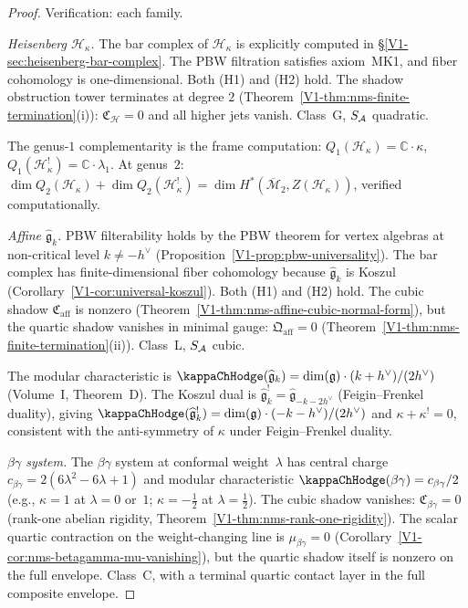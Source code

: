 \begin{proof}
Verification: each family.

\emph{Heisenberg $\mathcal{H}_\kappa$.}
The bar complex of $\mathcal{H}_\kappa$ is explicitly
computed in \S\ref{V1-sec:heisenberg-bar-complex}. The
PBW filtration satisfies axiom~MK1, and fiber
cohomology is one-dimensional. Both (H1) and (H2) hold.
The shadow obstruction tower terminates at degree $2$
(Theorem~\ref{V1-thm:nms-finite-termination}(i)):
$\mathfrak{C}_{\mathcal{H}} = 0$ and all higher jets vanish.
Class~G, $S_{\mathcal{A}}$ quadratic.

The genus-$1$ complementarity is the frame computation:
$Q_1(\mathcal{H}_\kappa) = \mathbb{C} \cdot \kappa$,
$Q_1(\mathcal{H}_\kappa^!) = \mathbb{C} \cdot \lambda_1$.
At genus~$2$:
$\dim Q_2(\mathcal{H}_\kappa) + \dim Q_2(\mathcal{H}_\kappa^!)
= \dim H^*(\overline{\mathcal{M}}_2, Z(\mathcal{H}_\kappa))$,
verified computationally.

\emph{Affine $\widehat{\mathfrak{g}}_k$.}
PBW filterability holds by the PBW theorem for vertex algebras
at non-critical level $k \ne -h^{\vee}$
(Proposition~\ref{V1-prop:pbw-universality}).
The bar complex has finite-dimensional fiber cohomology
because $\widehat{\mathfrak{g}}_k$ is Koszul
(Corollary~\ref{V1-cor:universal-koszul}).
Both (H1) and (H2) hold.
The cubic shadow $\mathfrak{C}_{\mathrm{aff}}$ is nonzero
(Theorem~\ref{V1-thm:nms-affine-cubic-normal-form}), but the
quartic shadow vanishes in minimal gauge:
$\mathfrak{Q}_{\mathrm{aff}} = 0$
(Theorem~\ref{V1-thm:nms-finite-termination}(ii)).
Class~L, $S_{\mathcal{A}}$ cubic.

The modular characteristic is
$\kappaChHodge(\widehat{\mathfrak{g}}_k) = \dim(\mathfrak{g})\cdot(k+h^\vee)/(2h^\vee)$
(Volume~I, Theorem~D).
The Koszul dual is
$\widehat{\mathfrak{g}}_k^! =
\widehat{\mathfrak{g}}_{-k-2h^{\vee}}$
(Feigin--Frenkel duality), giving
$\kappaChHodge(\widehat{\mathfrak{g}}_k^!)
= \dim(\mathfrak{g}) \cdot (-k - h^{\vee})/(2h^{\vee})$
and $\kappa + \kappa^! = 0$, consistent with the
anti-symmetry of $\kappa$ under Feigin--Frenkel duality.

\emph{$\beta\gamma$ system.}
The $\beta\gamma$ system at conformal weight~$\lambda$ has central charge
$c_{\beta\gamma} = 2(6\lambda^2 - 6\lambda + 1)$ and
modular characteristic $\kappaChHodge(\beta\gamma) = c_{\beta\gamma}/2$
(e.g., $\kappa = 1$ at $\lambda = 0$ or~$1$; $\kappa = -\tfrac{1}{2}$ at $\lambda = \tfrac{1}{2}$).
The cubic shadow vanishes: $\mathfrak{C}_{\beta\gamma} = 0$
(rank-one abelian rigidity,
Theorem~\ref{V1-thm:nms-rank-one-rigidity}).
The scalar quartic contraction on the weight-changing line is
$\mu_{\beta\gamma} = 0$
(Corollary~\ref*{V1-cor:nms-betagamma-mu-vanishing}), but the
quartic shadow itself is nonzero on the full envelope.
Class~C, with a terminal quartic contact layer in the full composite
envelope.


\end{proof}
